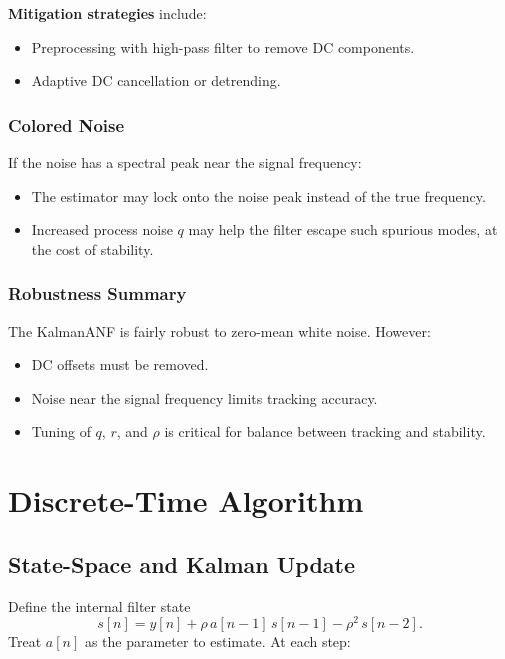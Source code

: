 \documentclass{article}
\begin{document}
\textbf{Mitigation strategies} include:
\begin{itemize}
    \item Preprocessing with high-pass filter to remove DC components.
    \item Adaptive DC cancellation or detrending.
\end{itemize}

\subsubsection*{Colored Noise}
If the noise has a spectral peak near the signal frequency:
\begin{itemize}
    \item The estimator may lock onto the noise peak instead of the true frequency.
    \item Increased process noise \(q\) may help the filter escape such spurious modes, at the cost of stability.
\end{itemize}

\subsubsection*{Robustness Summary}
The KalmanANF is fairly robust to zero-mean white noise. However:
\begin{itemize}
    \item DC offsets must be removed.
    \item Noise near the signal frequency limits tracking accuracy.
    \item Tuning of \(q\), \(r\), and \(\rho\) is critical for balance between tracking and stability.
\end{itemize}

\section{Discrete-Time Algorithm}

\subsection{State-Space and Kalman Update}
Define the internal filter state
\[
s[n] = y[n] + \rho\,a[n-1]\,s[n-1] - \rho^2\,s[n-2].
\]
Treat \(a[n]\) as the parameter to estimate.  At each step:
\end{document}
